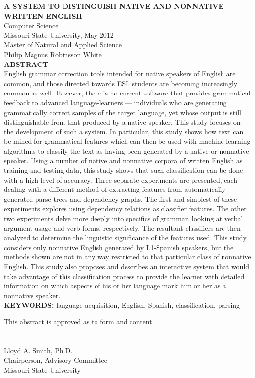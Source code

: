 \documentclass[main.tex]{subfiles}
\begin{document}
\noindent\textbf{A SYSTEM TO DISTINGUISH NATIVE AND NONNATIVE WRITTEN ENGLISH}\\
\noindent Computer Science\\
\noindent Missouri State University, May 2012\\
\noindent Master of Natural and Applied Science\\
\noindent Philip Magnus Robinsson White\\
\null
\noindent\textbf{ABSTRACT}\\
\singlespacing
\noindent English grammar correction tools intended for native speakers of English are common, and those directed towards ESL students are becoming increasingly common as well. However, there is no current software that provides grammatical feedback to advanced language-learners --- individuals who are generating grammatically correct samples of the target language, yet whose output is still distinguishable from that produced by a native speaker. This study focuses on the development of such a system. In particular, this study shows how text can be mined for grammatical features which can then be used with machine-learning algorithms to classify the text as having been generated by a native or nonnative speaker. Using a number of native and nonnative corpora of written English as training and testing data, this study shows that such classification can be done with a high level of accuracy. Three separate experiments are presented, each dealing with a different method of extracting features from automatically-generated parse trees and dependency graphs. The first and simplest of these experiments explores using dependency relations as classifier features. The other two experiments delve more deeply into specifics of grammar, looking at verbal argument usage and verb forms, respectively. The resultant classifiers are then analyzed to determine the linguistic significance of the features used. This study considers only nonnative English generated by L1-Spanish speakers, but the methods shown are not in any way restricted to that particular class of nonnative English. This study also proposes and describes an interactive system that would take advantage of this classification process to provide the learner with detailed information on which aspects of his or her language mark him or her as a nonnative speaker.\\
\null
\noindent \textbf{KEYWORDS:} language acquisition, English, Spanish, classification, parsing\\
\null
\raggedleft
\begin{minipage}[b]{3.5in}
This abstract is approved as to form and content\\\\

\makebox[3.5in]{\hrulefill}\\
Lloyd A. Smith, Ph.D.\\
Chairperson, Advisory Committee\\
Missouri State University
\end{minipage}
\end{document}
